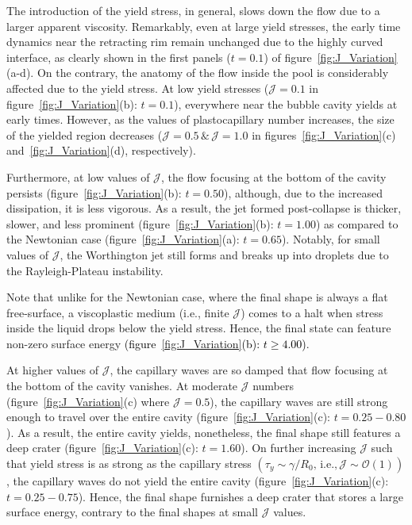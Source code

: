 \documentclass[final]{jfm}
\newcommand*\red{\textcolor{black}}
\begin{document}
The introduction of the yield stress, in general, slows down the flow due to a larger apparent viscosity. Remarkably, even at large yield stresses, the early time dynamics near the retracting rim remain unchanged due to the highly curved interface, as clearly shown in the first panels ($t = 0.1$) of figure~\ref{fig:J_Variation} (a-d).  
On the contrary, the anatomy of the flow inside the pool is considerably affected due to the yield stress. At low yield stresses ($\mathcal{J} = 0.1$ in figure~\ref{fig:J_Variation}(b): $t = 0.1$), everywhere near the bubble cavity yields at early times. However, as the values of plastocapillary number increases, the size of the yielded region decreases ($\mathcal{J} = 0.5\, \&\,\mathcal{J} = 1.0$ in figures~\ref{fig:J_Variation}(c) and~\ref{fig:J_Variation}(d), respectively). 

Furthermore, at low values of $\mathcal{J}$, the flow focusing at the bottom of the cavity persists (figure~\ref{fig:J_Variation}(b): $t = 0.50$), although, due to the increased dissipation, it is less vigorous. As a result, the jet formed post-collapse is thicker, slower, and less prominent (figure~\ref{fig:J_Variation}(b): $t = 1.00$) as compared to the Newtonian case (figure~\ref{fig:J_Variation}(a): $t = 0.65$). Notably, for small values of $\mathcal{J}$, the Worthington jet still forms and breaks up into droplets due to the Rayleigh-Plateau instability. 

Note that unlike for the Newtonian case, where the final shape is always a flat free-surface, a viscoplastic medium (i.e., finite $\mathcal{J}$) comes to a halt when stress inside the liquid drops below the yield stress. Hence, the final state can feature non-zero surface energy \red{(figure~\ref{fig:J_Variation}(b): $t \ge 4.00$)}. 

At higher values of $\mathcal{J}$, the capillary waves are so damped that flow focusing at the bottom of the cavity vanishes. At moderate $\mathcal{J}$ numbers (figure~\ref{fig:J_Variation}(c) where $\mathcal{J} = 0.5$), the capillary waves are still strong enough to travel over the entire cavity (figure~\ref{fig:J_Variation}(c): $t = 0.25 - 0.80$). As a result, the entire cavity yields, nonetheless,  the final shape still features a deep crater (figure~\ref{fig:J_Variation}(c): $t = 1.60$). 
On further increasing $\mathcal{J}$ such that yield stress is as strong as the capillary stress $\left(\tau_y \sim \gamma/R_0\text{, i.e.,}\,\mathcal{J} \sim \mathcal{O}\left(1\right)\right)$, the capillary waves do not yield the entire cavity (figure~\ref{fig:J_Variation}(c): $t = 0.25 - 0.75$). Hence, the final shape furnishes a deep crater that stores a large surface energy, contrary to the final shapes at small $\mathcal{J}$  values.
\end{document}
